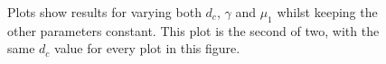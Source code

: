 \begin{figure}[h]
    \centering
    \caption{Plots show results for varying both $d_c$, $\gamma$ and $\mu_1$ whilst keeping the other parameters constant. This plot is the second of two, with the same $d_c$ value for every plot in this figure.}
    \label{fig:prolif_dc_gamma_mu_1_variation_2}
\end{figure}

